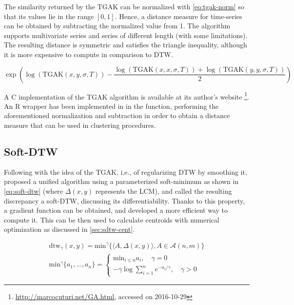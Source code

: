 The similarity returned by the TGAK can be normalized with \cref{eq:tgak-norm} so that its values lie in the range $[0,1]$.
Hence, a distance measure for time-series can be obtained by subtracting the normalized value from 1.
The algorithm supports multivariate series and series of different length (with some limitations).
The resulting distance is symmetric and satisfies the triangle inequality,
although it is more expensive to compute in comparison to DTW.

\begin{equation}
\label{eq:tgak-norm}
\exp \left( \log\left( \text{TGAK}(x,y,\sigma,T) \right) - \frac{\log\left( \text{TGAK}(x,x,\sigma,T) \right) + \log\left( \text{TGAK}(y,y,\sigma,T) \right)}{2} \right)
\end{equation}

A C implementation of the TGAK algorithm is available at its author's website%
\footnote{\url{http://marcocuturi.net/GA.html}, accessed on 2016-10-29}.
An R wrapper has been implemented in \dtwclust{} in the  function,
performing the aforementioned normalization and subtraction in order to obtain a distance measure that can be used in clustering procedures.

\subsection{Soft-DTW}
\label{sec:sdtw}

Following with the idea of the TGAK,
i.e., of regularizing DTW by smoothing it,
\citet{cuturi2017} proposed a unified algorithm using a parameterized soft-minimum as shown in \cref{eq:soft-dtw}
(where $\Delta(x,y)$ represents the LCM),
and called the resulting discrepancy a soft-DTW,
discussing its differentiability.
Thanks to this property,
a gradient function can be obtained,
and \citet{cuturi2017} developed a more efficient way to compute it.
This can be then used to calculate centroids with numerical optimization as discussed in \cref{sec:sdtw-cent}.

\begin{subequations}
\label{eq:soft-dtw}
\begin{gather}
\text{dtw}_\gamma(x,y) = \text{min} ^ \gamma \lbrace \langle A, \Delta(x,y) \rangle, A \in \mathcal{A}(n,m) \rbrace \\
\text{min} ^ \gamma \lbrace a_1, \ldots, a_n \rbrace =
\begin{cases}
\text{min}_{i \leq n} a_i, \quad \gamma = 0 \\
-\gamma \log \sum_{i=1}^{n} e^{-a_i / \gamma}, \quad \gamma > 0
\end{cases}
\end{gather}
\end{subequations}

